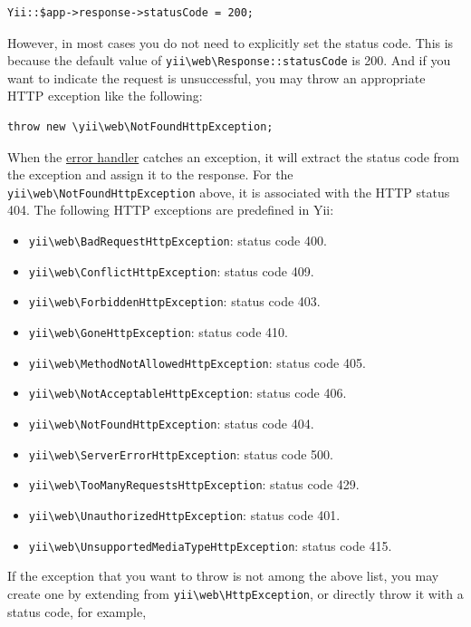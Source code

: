 \lstset{language=php}\begin{lstlisting}
Yii::$app->response->statusCode = 200;
\end{lstlisting}
However, in most cases you do not need to explicitly set the status code. This is because the default value
of \texttt{yii{\allowbreak{}\textbackslash}web{\allowbreak{}\textbackslash}Response\allowbreak{}::\allowbreak{}statusCode} is 200. And if you want to indicate the request is unsuccessful, you may
throw an appropriate HTTP exception like the following:

\lstset{language=php}\begin{lstlisting}
throw new \yii\web\NotFoundHttpException;
\end{lstlisting}
When the \hyperref[runtime-handling-errors.md]{error handler} catches an exception, it will extract the status code 
from the exception and assign it to the response. For the \texttt{yii{\allowbreak{}\textbackslash}web{\allowbreak{}\textbackslash}NotFoundHttpException} above, it is
associated with the HTTP status 404. The following HTTP exceptions are predefined in Yii:

\begin{itemize}
\item \texttt{yii{\allowbreak{}\textbackslash}web{\allowbreak{}\textbackslash}BadRequestHttpException}: status code 400.
\item \texttt{yii{\allowbreak{}\textbackslash}web{\allowbreak{}\textbackslash}ConflictHttpException}: status code 409.
\item \texttt{yii{\allowbreak{}\textbackslash}web{\allowbreak{}\textbackslash}ForbiddenHttpException}: status code 403.
\item \texttt{yii{\allowbreak{}\textbackslash}web{\allowbreak{}\textbackslash}GoneHttpException}: status code 410.
\item \texttt{yii{\allowbreak{}\textbackslash}web{\allowbreak{}\textbackslash}MethodNotAllowedHttpException}: status code 405.
\item \texttt{yii{\allowbreak{}\textbackslash}web{\allowbreak{}\textbackslash}NotAcceptableHttpException}: status code 406. 
\item \texttt{yii{\allowbreak{}\textbackslash}web{\allowbreak{}\textbackslash}NotFoundHttpException}: status code 404.
\item \texttt{yii{\allowbreak{}\textbackslash}web{\allowbreak{}\textbackslash}ServerErrorHttpException}: status code 500.
\item \texttt{yii{\allowbreak{}\textbackslash}web{\allowbreak{}\textbackslash}TooManyRequestsHttpException}: status code 429.
\item \texttt{yii{\allowbreak{}\textbackslash}web{\allowbreak{}\textbackslash}UnauthorizedHttpException}: status code 401.
\item \texttt{yii{\allowbreak{}\textbackslash}web{\allowbreak{}\textbackslash}UnsupportedMediaTypeHttpException}: status code 415.
\end{itemize}
If the exception that you want to throw is not among the above list, you may create one by extending
from \texttt{yii{\allowbreak{}\textbackslash}web{\allowbreak{}\textbackslash}HttpException}, or directly throw it with a status code, for example,

